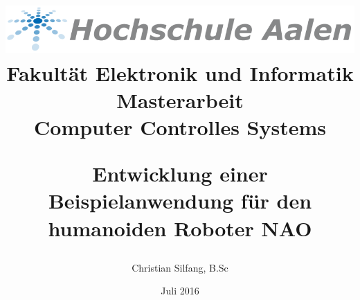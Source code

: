 \begin{titlepage}
\title{
	\begin{center}
		\Huge{\includegraphics[scale=0.5]{title/logo_htw_aalen.png}}\\
		\large{Fakultät Elektronik und Informatik}\\
		\vspace{1cm}
		\Huge{Masterarbeit}\\
		\large{Computer Controlles Systems}\\
	\end{center}
	\vspace{2cm}
	\begin{center}
		\Huge{Entwicklung einer Beispielanwendung für den humanoiden Roboter NAO}\\
		\vspace{3cm}
	\end{center}
}
\author{Christian Silfang, B.Sc}
\vfill
\date{\Huge{Juli 2016}}
\end{titlepage} 

